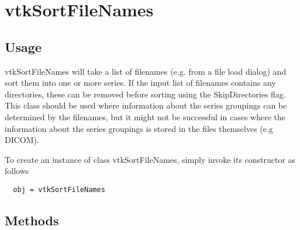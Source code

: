 \section{vtkSortFileNames}

\subsection{Usage}

 vtkSortFileNames will take a list of filenames (e.g. from
 a file load dialog) and sort them into one or more series.  If
 the input list of filenames contains any directories, these can
 be removed before sorting using the SkipDirectories flag.  This
 class should be used where information about the series groupings
 can be determined by the filenames, but it might not be successful
 in cases where the information about the series groupings is
 stored in the files themselves (e.g DICOM).

To create an instance of class vtkSortFileNames, simply
invoke its constructor as follows
\begin{verbatim}
  obj = vtkSortFileNames
\end{verbatim}
\subsection{Methods}

